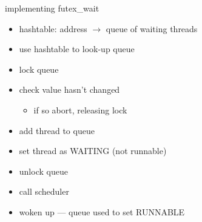 \begin{frame}{implementing futex\_wait}
\begin{itemize}
\item hashtable: address $\rightarrow$ queue of waiting threads
\vspace{.5cm}
\item use hashtable to look-up queue
\item lock queue
\item check value hasn't changed
    \begin{itemize}
    \item if so abort, releasing lock
    \end{itemize}
\item add thread to queue
\item set thread as WAITING (not runnable)
\item unlock queue
\item call scheduler
\vspace{.5cm}
\item woken up --- queue used to set RUNNABLE
\end{itemize}
\end{frame}
